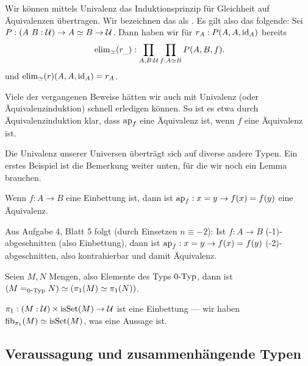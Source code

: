 \begin{bemerkung}
  Wir können mittels Univalenz das Induktionsprinzip für Gleichheit auf Äquivalenzen übertragen.
  Wir bezeichnen das als .
  Es gilt also das folgende: Sei $P:(A\ B :\mathcal{U})\to A\simeq B\to \mathcal{U}$.
  Dann haben wir für $r_A:P(A,A,\mathrm{id}_A)$ bereits
  \[
     \elim_\simeq(r_{\_}):\prod_{A,B:\mU}\prod_{f:A\simeq B}P(A,B,f)\rlap{.}
     \]
     und $\mathrm{elim}_\simeq(r)(A,A,\mathrm{id}_A)=r_A$.
\end{bemerkung}

\begin{bemerkung}
  Viele der vergangenen Beweise hätten wir auch mit Univalenz (oder Äquivalenzinduktion) schnell erledigen können.
  So ist es etwa durch Äquivalenzinduktion klar, dass $\mathrm{ap}_f$ eine Äquivalenz ist, wenn $f$ eine Äquivalenz ist.
\end{bemerkung}

Die Univalenz unserer Universen überträgt sich auf diverse andere Typen.
Ein erstes Beispiel ist die Bemerkung weiter unten, für die wir noch ein Lemma brauchen.

\begin{lemma}
  Wenn $f:A\to B$ eine Einbettung ist,
  dann ist $\mathrm{ap}_f:x=y\to f(x)=f(y)$ eine Äquivalenz.
\end{lemma}

\begin{beweis}
  Aus Aufgabe 4, Blatt 5 folgt (durch Einsetzen $n\equiv -2$):
  Ist $f:A\to B$ (-1)-abgeschnitten (also Einbettung), dann ist $\mathrm{ap}_f:x=y\to f(x)=f(y)$ (-2)-abgeschnitten, also kontrahierbar und damit Äquivalenz.
\end{beweis}

\begin{bemerkung}
  Seien $M,N$ Mengen, also Elemente des Typs $0\mbox{-}\mathrm{Typ}$, dann ist
  $(M=_{0\mbox{-}\mathrm{Typ}}N)\simeq (\pi_1(M)\simeq \pi_1(N))$.
\end{bemerkung}

\begin{beweis}
  $\pi_1:(M:\mathcal{U})\times \mathrm{isSet}(M)\to \mathcal{U}$ ist eine Einbettung ---
  wir haben $\mathrm{fib}_{\pi_1}(M)\simeq \mathrm{isSet}(M)$, was eine Aussage ist.
\end{beweis}

\subsection{Veraussagung und zusammenhängende Typen}

